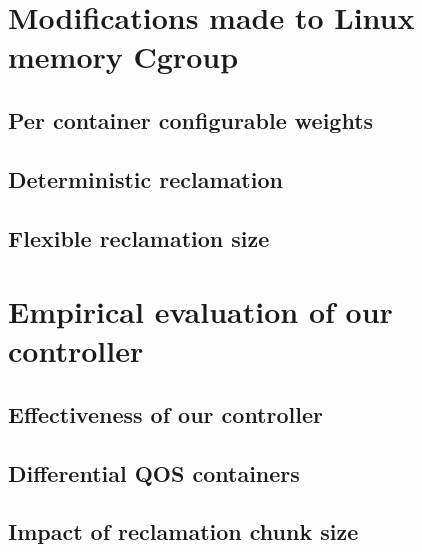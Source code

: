   
  
  \section{Modifications made to Linux memory Cgroup}
  
    \subsection{Per container configurable weights}
    
    \subsection{Deterministic reclamation}
    
    \subsection{Flexible reclamation size}
    
  
  
  \section{Empirical evaluation of our controller}
  
    \subsection{Effectiveness of our controller}
    
    \subsection{Differential QOS containers}
    
    \subsection{Impact of reclamation chunk size}